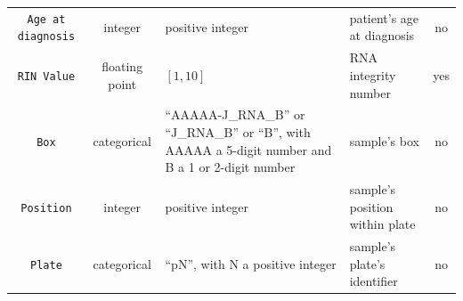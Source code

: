\begin{table}[!ht]
\begin{threeparttable}
\begin{tabular}{c | c p{3.5cm} p{3cm} c}
        \texttt{Age at diagnosis}
            & integer & positive integer & patient's age at diagnosis & no \\
        \texttt{RIN Value}
            & floating point & $[1, 10]$ & RNA integrity number & yes \\
        \texttt{Box}
            & categorical 
            & ``AAAAA-J\_RNA\_B'' or ``J\_RNA\_B'' or ``B'', 
              with AAAAA a 5-digit number and B a 1 or 2-digit number 
            & sample's box & no \\
        \texttt{Position} 
            & integer & positive integer & sample's position within plate & no \\ 
        \texttt{Plate} 
            & categorical & ``pN'', with N a positive integer & sample's plate's identifier & no \\ 
        \bottomrule 
    \end{tabular}
    \end{threeparttable}
\end{table}

